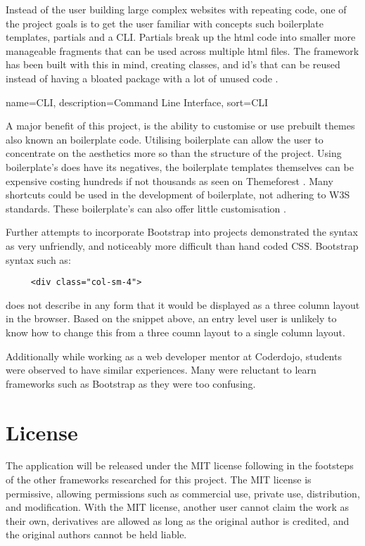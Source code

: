Instead of the user building large complex websites with repeating code, one of the project goals is to get the user familiar with concepts such boilerplate templates, partials and a \gls{CLI}. Partials break up the html code into smaller more manageable fragments that can be used across multiple html files. The framework has been built with this in mind, creating classes, and id's that can be reused instead of having a bloated package with a lot of unused code \citep{KAR15}.

{
  name={CLI},
  description={Command Line Interface},
  sort=CLI
}

A major benefit of this project, is the ability to customise or use prebuilt themes also known an boilerplate code. Utilising boilerplate can allow the user to concentrate on the aesthetics more so than the structure of the project. Using boilerplate's does have its negatives, the boilerplate templates themselves can be expensive costing hundreds if not thousands as seen on Themeforest \citep{THEME17}. Many shortcuts could be used in the development of boilerplate, not adhering to W3S standards. These boilerplate's can also offer little customisation \citep{NATH16}.

Further attempts to incorporate Bootstrap into projects demonstrated the syntax as very unfriendly, and noticeably more difficult than hand coded \gls{CSS}. Bootstrap syntax such as: \begin{lstlisting}
	 <div class="col-sm-4">\end{lstlisting} 
	 does not describe in any form that it would be displayed as a three column layout in the browser. Based on the snippet above, an entry level user is unlikely to know how to change this from a three coumn layout to a single column layout. 
	 
Additionally while working as a web developer mentor at Coderdojo, students were observed to have similar experiences. Many were reluctant to learn frameworks such as Bootstrap as they were too confusing.

%
\section*{License}
The application will be released under the MIT license following in the footsteps of the other frameworks researched for this project. The MIT license is permissive, allowing permissions such as commercial use, private use, distribution, and modification. With the MIT license, another user cannot claim the work as their own, derivatives are allowed as long as the original author is credited, and the original authors cannot be held liable.

